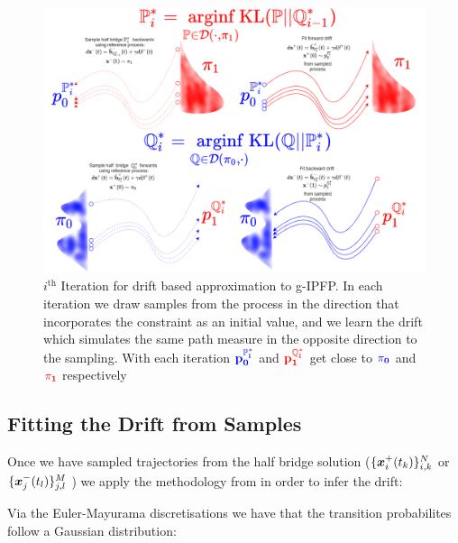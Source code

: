 \documentclass[a4paper,12pt,twoside,openright]{report}
\theoremstyle{definition}
\begin{document}
\begin{figure}
    \centering
    \includegraphics[width=\linewidth]{images/gp_IPFP.PNG}
    \caption{$i^{\text{th}}$ Iteration for drift based approximation to g-IPFP. In each iteration we draw samples from the process in the direction that incorporates the constraint as an initial value, and we learn the drift which simulates the same path measure in the opposite direction to the sampling. With each iteration $\mathbf{\color{blue}{p^{\P^{*}_i}_0}}$ and $\mathbf{\color{red}{p^{\Q^{*}_i}_1}}$ get close to $\mathbf{\color{blue}{\pi_0}}$ and $\mathbf{\color{red}{\pi_1}}$ respectively}
    \label{fig:gp_drift}
\end{figure}
\subsection{Fitting the Drift from Samples}

Once we have sampled trajectories from the half bridge solution ($\{\vx^{+}_i(t_k)\}_{i,k}^N$ or  $\{\vx^{-}_j(t_l)\}_{j,l}^M$ ) we  apply the methodology from \citep{ruttor2013approximate, batz2018approximate} in order to infer the drift:

Via the Euler-Mayurama discretisations we have that the transition probabilites follow a Gaussian distribution:
\end{document}
